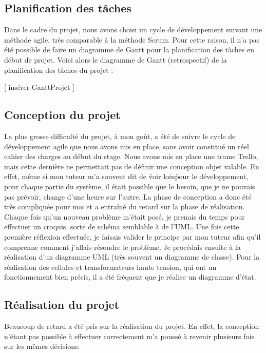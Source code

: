 \documentclass[a4paper]{article}
\begin{document}
    \subsection{Planification des tâches}
    
     Dans le cadre du projet, nous avons choisi un cycle de développement suivant une méthode agile, très comparable à la méthode Scrum. Pour cette raison, il n'a pas été possible de faire un diagramme de Gantt pour la planification des tâches en début de projet. Voici alors le diagramme de Gantt (retrospectif) de la planification des tâches du projet :

     [ insérer GanttProjet ]   

    \subsection{Conception du projet}

    La plus grosse difficulté du projet, à mon goût, a été de suivre le cycle de développement agile que nous avons mis en place, sans avoir constitué un réel cahier des charges au début du stage. Nous avons mis en place une trame Trello, mais cette dernière ne permettait pas de définir une conception objet valable. En effet, même si mon tuteur m'a souvent dit de \"voir loin\" pour le développement, pour chaque partie du système, il était possible que le besoin, que je ne pouvais pas prévoir, change d'une heure sur l'autre. La phase de conception a donc été très compliquée pour moi et a entraîné du retard sur la phase de réalisation. \\
    
    Chaque fois qu'un nouveau problème m'était posé, je prenais du temps pour effectuer un croquis, sorte de schéma semblable à de l'UML. Une fois cette première réflexion effectuée, je faisais valider le principe par mon tuteur afin qu'il comprenne comment j'allais résoudre le problème. Je procédais ensuite à la réalisation d'un diagramme UML (très souvent un diagramme de classe). Pour la réalisation des cellules et transformateurs haute tension, qui ont un fonctionnement bien précis, il a été fréquent que je réalise un diagramme d'état. \\ 

    \subsection{Réalisation du projet}

    Beaucoup de retard a été pris sur la réalisation du projet. En effet, la conception n'étant pas possible à effectuer correctement m'a poussé à revenir plusieurs fois sur les mêmes décisions. \\
\end{document}
